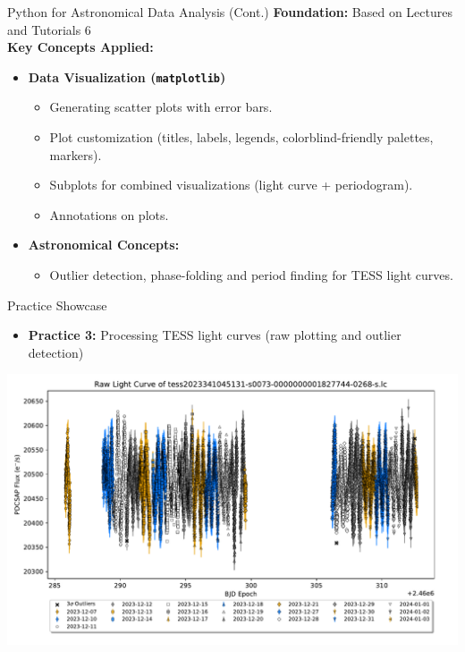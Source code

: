 \documentclass[12pt, aspectratio=169]{beamer}
\renewcommand{\small}{\fontsize{11}{13}\selectfont}
\newcommand{\rcode}[1]{{\small\texttt{#1}}}
\begin{document}
  \begin{frame}[t]{Python for Astronomical Data Analysis (Cont.)}
    \textbf{Foundation:} Based on Lectures and Tutorials 6
    \\\vspace{2.5mm}
    \textbf{Key Concepts Applied:} \\\vspace{2.5mm}
    \begin{itemize}
      \item \textbf{Data Visualization (\rcode{matplotlib})} \vspace{1mm}
      \begin{itemize}
        \item Generating scatter plots with error bars.
        \item Plot customization (titles, labels, legends, colorblind-friendly
        palettes, markers).
        \item Subplots for combined visualizations (light curve + periodogram).
        \item Annotations on plots.
      \end{itemize} \vspace{1mm}
      \item \textbf{Astronomical Concepts:} \vspace{1mm}
      \begin{itemize}
        \item Outlier detection, phase-folding and period finding for TESS light
        curves.
      \end{itemize}
    \end{itemize}
  \end{frame}

  \begin{frame}[t]{Practice Showcase}
    \begin{itemize}
      \item \textbf{Practice 3:} Processing TESS light curves (raw plotting and
      outlier detection)
    \end{itemize}
    \centering
    \includegraphics[width=1.35\textheight]{figures/3-1.pdf}
  \end{frame}
\end{document}
